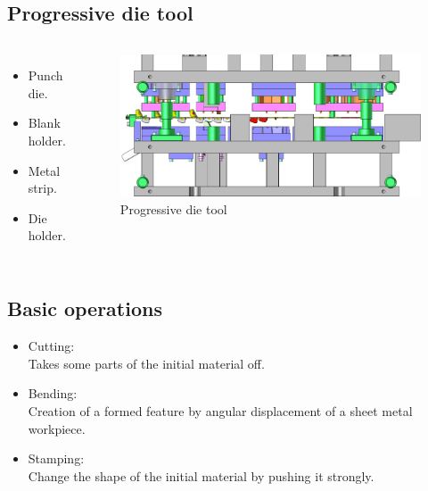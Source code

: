 \documentclass{beamer}
\begin{document}
\subsection{Progressive die tool}
\begin{frame}
    \begin{columns}
        \begin{itemize}
            \item Punch die.
            \item Blank holder.
            \item Metal strip.
            \item Die holder.
        \end{itemize}
        \begin{figure}
            \includegraphics[width=\textwidth]{img/dieTool.jpg}
            \caption{Progressive die tool}
        \end{figure}
    \end{columns}
\end{frame}
\subsection{Basic operations}
\begin{frame}
    \begin{itemize}
        \item Cutting:\\
            Takes some parts of the initial material off.
        \item Bending:\\
            Creation of a formed feature by angular displacement of a sheet metal workpiece.
        \item Stamping:\\
            Change the shape of the initial material by pushing it strongly.
    \end{itemize}
\end{frame}
\end{document}
